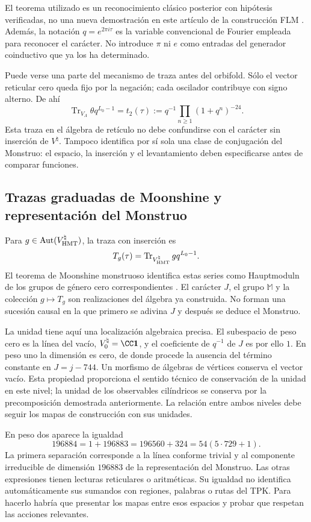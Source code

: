 El teorema utilizado es un reconocimiento clásico posterior con
hipótesis verificadas, no una nueva demostración en este artículo de
la construcción FLM \cite{flm}.
Además, la notación $q=e^{2\pi i\tau}$ es la variable convencional
de Fourier empleada para reconocer el carácter. No introduce $\pi$
ni $e$ como entradas del generador coinductivo que ya los ha determinado.

Puede verse una parte del mecanismo de traza antes del orbifold.
Sólo el vector reticular cero queda fijo por la negación; cada
oscilador contribuye con signo alterno. De ahí
\[
 \operatorname{Tr}_{V_\Lambda}\theta q^{L_0-1}
   =t_2(\tau)
   :=q^{-1}\prod_{n\geq1}(1+q^n)^{-24}.
\]
Esta traza en el álgebra de retículo no debe confundirse con el
carácter sin inserción de $V^\natural$. Tampoco identifica por sí
sola una clase de conjugación del Monstruo: el espacio, la inserción
y el levantamiento deben especificarse antes de comparar funciones.

\subsection{Trazas graduadas de Moonshine y representación del Monstruo}
\label{exc:alcance}

Para $g\in\operatorname{Aut}(V^\natural_{\rm HMT})$, la traza
con inserción es
\[
 T_g(\tau)=
 \operatorname{Tr}_{V^\natural_{\rm HMT}}gq^{L_0-1}.
\]
El teorema de Moonshine monstruoso identifica estas series como
Hauptmoduln de los grupos de género cero correspondientes
\cite[teorema~1.1]{borcherds}.
El carácter $J$, el grupo $\mathbb M$ y la colección $g\mapsto T_g$
son realizaciones del álgebra ya construida. No forman una sucesión
causal en la que primero se adivina $J$ y después se deduce el Monstruo.

La unidad tiene aquí una localización algebraica precisa. El subespacio
de peso cero es la línea del vacío, \(V^\natural_0=\CC\mathbf1\), y
el coeficiente de \(q^{-1}\) de \(J\) es por ello \(1\). En peso uno
la dimensión es cero, de donde procede la ausencia del término constante
en \(J=j-744\). Un morfismo de álgebras de vértices conserva el vector
vacío. Esta propiedad proporciona el sentido técnico de conservación
de la unidad en este nivel; la unidad de los observables cilíndricos
se conserva por la precomposición demostrada anteriormente. La relación
entre ambos niveles debe seguir los mapas de construcción con sus unidades.

En peso dos aparece la igualdad
\[
 196884=1+196883=196560+324=54(5\cdot729+1).
\]
La primera separación corresponde a la línea conforme trivial y al
componente irreducible de dimensión $196883$ de la representación
del Monstruo. Las otras expresiones tienen lecturas reticulares o
aritméticas. Su igualdad no identifica automáticamente sus sumandos
con regiones, palabras o rutas del TPK. Para hacerlo habría que
presentar los mapas entre esos espacios y probar que respetan las
acciones relevantes.

